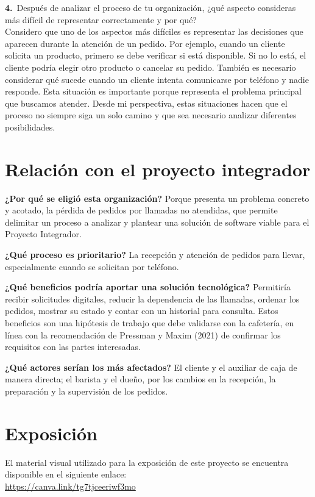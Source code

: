 \documentclass[12pt,letterpaper]{article}
\newcommand{\negr}[1]{\textsf{\bfseries\color{verde} #1}}
\begin{document}
\vspace{0.4cm}
\noindent\negr{4.}\ Después de analizar el proceso de tu organización, ¿qué aspecto consideras más difícil de representar correctamente y por qué?\\
Considero que uno de los aspectos más difíciles es representar las decisiones que aparecen durante la atención de un pedido. Por ejemplo, cuando un cliente solicita un producto, primero se debe verificar si está disponible. Si no lo está, el cliente podría elegir otro producto o cancelar su pedido. También es necesario considerar qué sucede cuando un cliente intenta comunicarse por teléfono y nadie responde. Esta situación es importante porque representa el problema principal que buscamos atender. Desde mi perspectiva, estas situaciones hacen que el proceso no siempre siga un solo camino y que sea necesario analizar diferentes posibilidades.

\clearpage
\section{Relación con el proyecto integrador}

\textbf{¿Por qué se eligió esta organización?} Porque presenta un problema concreto y acotado, la pérdida de pedidos por llamadas no atendidas, que permite delimitar un proceso a analizar y plantear una solución de software viable para el Proyecto Integrador.

\textbf{¿Qué proceso es prioritario?} La recepción y atención de pedidos para llevar, especialmente cuando se solicitan por teléfono.

\textbf{¿Qué beneficios podría aportar una solución tecnológica?} Permitiría recibir solicitudes digitales, reducir la dependencia de las llamadas, ordenar los pedidos, mostrar su estado y contar con un historial para consulta. Estos beneficios son una hipótesis de trabajo que debe validarse con la cafetería, en línea con la recomendación de Pressman y Maxim (2021) de confirmar los requisitos con las partes interesadas.

\textbf{¿Qué actores serían los más afectados?} El cliente y el auxiliar de caja de manera directa; el barista y el dueño, por los cambios en la recepción, la preparación y la supervisión de los pedidos.

\section{Exposición}
El material visual utilizado para la exposición de este proyecto se encuentra disponible en el siguiente enlace:\\
\url{https://canva.link/tg7tjceeriwf3mo}
\end{document}
